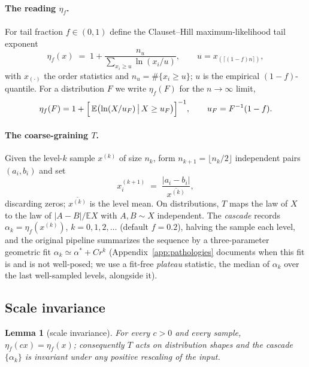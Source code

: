\documentclass[11pt,a4paper]{article}
\newtheorem{lemma}{Lemma}
\theoremstyle{remark}
\begin{document}
\paragraph{The reading $\eta_f$.} For tail fraction $f\in(0,1)$ define the Clauset--Hill
maximum-likelihood tail exponent \cite{hill,clauset}
\begin{equation}\label{eq:estimator}
\eta_f(x) \;=\; 1 + \frac{n_u}{\sum_{x_i \ge u}\ln (x_i/u)},
\qquad u = x_{(\lceil (1-f) n\rceil)},
\end{equation}
with $x_{(\cdot)}$ the order statistics and $n_u = \#\{x_i \ge u\}$; $u$ is the empirical
$(1-f)$-quantile. For a distribution $F$ we write $\eta_f(F)$ for the $n\to\infty$ limit,
\begin{equation}\label{eq:etaF}
\eta_f(F) = 1 + \Bigl[\,\mathbb{E}\bigl(\ln (X/u_F)\,\big|\,X \ge u_F\bigr)\Bigr]^{-1},
\qquad u_F = F^{-1}(1-f).
\end{equation}

\paragraph{The coarse-graining $T$.} Given the level-$k$ sample $x^{(k)}$ of size $n_k$, form
$n_{k+1} = \lfloor n_k/2\rfloor$ independent pairs $(a_i,b_i)$ and set
\begin{equation}\label{eq:T}
x^{(k+1)}_i \;=\; \frac{\lvert a_i - b_i\rvert}{\overline{x^{(k)}}},
\end{equation}
discarding zeros; $\overline{x^{(k)}}$ is the level mean. On distributions, $T$ maps the law of $X$
to the law of $|A-B|/\mathbb{E}X$ with $A,B \sim X$ independent. The \emph{cascade} records
$\alpha_k = \eta_f(x^{(k)})$, $k=0,1,2,\dots$ (default $f=0.2$), halving the sample each level, and
the original pipeline summarizes the sequence by a three-parameter geometric fit
$\alpha_k \simeq \alpha^* + C r^k$ (Appendix~\ref{app:pathologies} documents when this fit is and is
not well-posed; we use a fit-free \emph{plateau} statistic, the median of $\alpha_k$ over the last
well-sampled levels, alongside it).

\subsection{Scale invariance}

\begin{lemma}[scale invariance]\label{lem:scale}
For every $c>0$ and every sample, $\eta_f(cx) = \eta_f(x)$; consequently $T$ acts on distribution
\emph{shapes} and the cascade $\{\alpha_k\}$ is invariant under any positive rescaling of the input.
\end{lemma}
\end{document}
